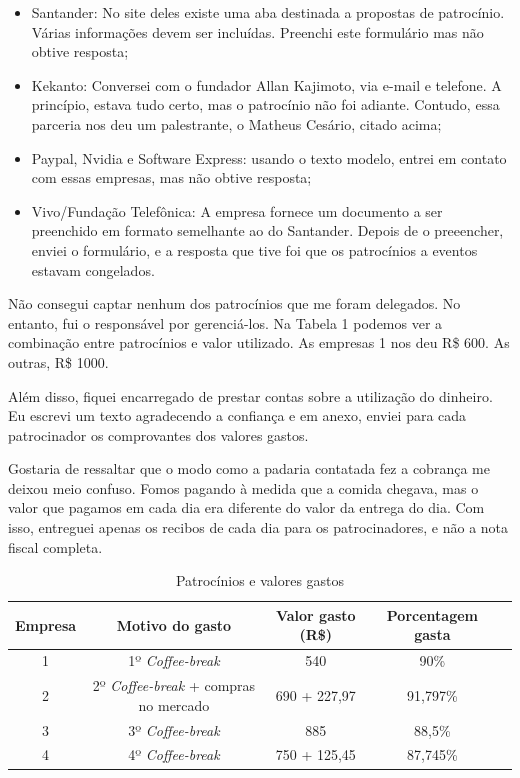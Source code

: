 \documentclass[12pt,letterpaper]{article}
\begin{document}
	\begin{itemize}
		\item Santander: No site deles existe uma aba destinada a propostas de patrocínio. Várias informações devem ser incluídas. Preenchi este formulário mas não obtive resposta;
		\item Kekanto: Conversei com o fundador Allan Kajimoto, via e-mail e telefone. A princípio, estava tudo certo, mas o patrocínio não foi adiante. Contudo, essa parceria nos deu um palestrante, o Matheus Cesário, citado acima;
		\item Paypal, Nvidia e Software Express: usando o texto modelo\cite{modelo_pat}, entrei em contato com essas empresas, mas não obtive resposta;
		\item Vivo/Fundação Telefônica: A empresa fornece um documento a ser preenchido em formato semelhante ao do Santander. Depois de o preeencher, enviei o formulário, e a resposta que tive foi que os patrocínios a eventos estavam congelados.
	\end{itemize}
	
	Não consegui captar nenhum dos patrocínios que me foram delegados. No entanto, fui o responsável por gerenciá-los. Na Tabela 1 podemos ver a combinação entre patrocínios e valor utilizado. As empresas 1 nos deu R\$ 600. As outras, R\$ 1000.

	Além disso, fiquei encarregado de prestar contas sobre a utilização do dinheiro. Eu escrevi um texto agradecendo a confiança e em anexo, enviei para cada patrocinador os comprovantes dos valores gastos\cite{modelo_agr}.
		
	Gostaria de ressaltar que o modo como a padaria contatada fez a cobrança me deixou meio confuso. Fomos pagando à medida que a comida chegava, mas o valor que pagamos em cada dia era diferente do valor da entrega do dia. Com isso, entreguei apenas os recibos de cada dia para os patrocinadores, e não a nota fiscal completa.
	
	\begin{table}[]
		\centering
		\begin{tabular}{|c|c|c|c|c|}
			\hline Empresa & Motivo do gasto               & Valor gasto (R\$) & Porcentagem gasta  \\ \hline
			1       & 1º \textit{Coffee-break}                      & 540               & 90\%   \\  \hline
			2       & 2º \textit{Coffee-break} + compras no mercado & 690 + 227,97      & 91,797\% \\ \hline
			3       & 3º \textit{Coffee-break}                      & 885               & 88,5\% \\ \hline
			4       & 4º \textit{Coffee-break}                      & 750 + 125,45      & 87,745\% \\ \hline 
		\end{tabular}
		\caption{Patrocínios e valores gastos}
	\end{table}
	
\end{document}

